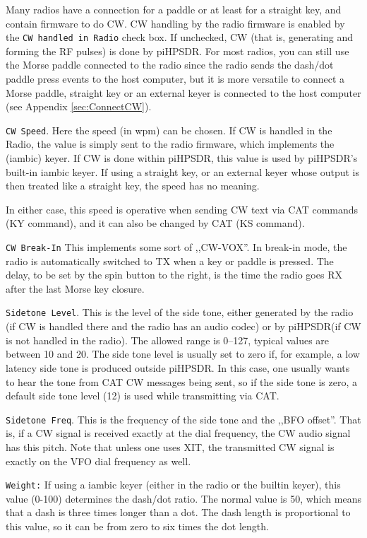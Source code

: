 \documentclass[12pt]{book}
\def\rett#1{\texttt{\color{red}#1}}
\def\pH{pi\-HPSDR\xspace}
\begin{document}
Many radios have a connection for a paddle or at least for
a straight key, and contain firmware to do CW. CW handling by
the radio firmware is enabled by the \rett{CW handled in Radio}
check box. If unchecked, CW (that is, generating and forming
the RF pulses) is done by \pH. For most radios, you can
still use the Morse paddle connected to the radio since the
radio sends the dash/dot paddle press events to the host
computer, but it is more versatile to connect
a Morse paddle, straight key or an external keyer is connected
to the host computer (see Appendix \ref{sec:ConnectCW}).

\rett{CW Speed}. Here the speed (in wpm) can be chosen. If CW is
handled in the Radio, the value is simply sent to the radio firmware,
which implements the (iambic) keyer. If CW is done within \pH,
this value is used by \pH's built-in iambic keyer. If using
a straight key, or an external keyer whose output is then treated
like a straight key, the speed has no meaning.

In either case, this speed is operative when sending CW text via
CAT commands (KY command), and it can also be changed by CAT
(KS command).

\rett{CW Break-In} This implements some sort of ,,CW-VOX''. In
break-in mode, the radio is automatically switched to TX when
a key or paddle is pressed. The delay, to be set by the spin
button to the right, is the time the radio goes RX after the
last Morse key closure.

\rett{Sidetone Level}. This is the level of the side tone,
either generated by the radio (if CW is handled there and the radio
has an audio codec) or
by \pH (if CW is not handled in the radio). The allowed range
is 0--127, typical values are between 10 and 20. The side tone level
is usually set to zero if, for example, a low latency side tone is
produced outside \pH. In this case, one usually wants to hear
the tone from CAT CW messages being sent, so if the side tone is
zero, a default side tone level (12) is used while transmitting
via CAT.

\rett{Sidetone Freq}. This is the frequency of the side tone and the
,,BFO offset''. That is, if a CW signal is received exactly at the
dial frequency, the CW audio signal has this pitch. Note that unless
one uses XIT, the transmitted CW signal is exactly on the VFO dial
frequency as well.

\rett{Weight:} If using a iambic keyer (either in the radio or
the builtin keyer), this value (0-100) determines the dash/dot ratio.
The normal value is 50, which means that a dash is three times longer
than a dot. The dash length is proportional to this value, so it can
be from zero to six times the dot length.
\end{document}
